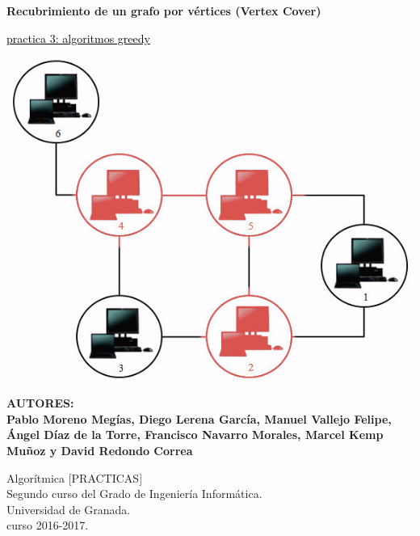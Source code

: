 \documentclass[a4paper, 11pt]{article}
\begin{document}
	
	
	\begin{titlepage}
		\begin{center}
			\vspace*{0.2cm}
			
			{\Huge \textbf{\textcolor{rojizo}{Recubrimiento de un grafo por vértices (Vertex Cover)}}}
			
						{\textcolor{black}	{\Huge\underline{practica 3: algoritmos greedy}}}
			
				\vspace{0.2cm}
				
				\includegraphics[width=\textwidth]{cover.jpg}
				\vspace{0.2cm}
				

		
			\vspace{1cm}
			
			\textbf{AUTORES: \\
					Pablo Moreno Megías, Diego Lerena García, Manuel Vallejo Felipe, Ángel Díaz de la Torre, Francisco Navarro Morales, Marcel Kemp Muñoz y David Redondo Correa
		    		 }
	    		 \vspace{1cm}
	   
			
			\vfill
			Algorítmica [PRACTICAS]\\
			Segundo curso del Grado de Ingeniería Informática.\\
			Universidad de Granada.\\
			curso 2016-2017.
		\end{center}
	\end{titlepage}
\end{document}
